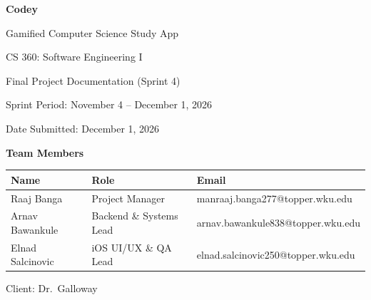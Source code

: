 \documentclass[12pt,letterpaper]{article}
\begin{document}
\begin{titlepage}
\begin{singlespace}
\centering
\vspace*{1.2in}
{\LARGE\bfseries Codey\par}
\vspace{0.25cm}
{\Large Gamified Computer Science Study App\par}
\vspace{1.2cm}
{\large CS 360: Software Engineering I\par}
\vspace{0.3cm}
{\large Final Project Documentation (Sprint 4)\par}
\vspace{0.3cm}
{\large Sprint Period: November 4 -- December 1, 2026\par}
\vspace{0.3cm}
{\large Date Submitted: December 1, 2026\par}
\vspace{1.6cm}
{\large\bfseries Team Members\par}
\vspace{0.4cm}
\begin{tabular}{lll}
\toprule
\textbf{Name} & \textbf{Role} & \textbf{Email} \\
\midrule
Raaj Banga        & Project Manager            & manraaj.banga277@topper.wku.edu \\
Arnav Bawankule   & Backend \& Systems Lead    & arnav.bawankule838@topper.wku.edu \\
Elnad Salcinovic  & iOS UI/UX \& QA Lead       & elnad.salcinovic250@topper.wku.edu \\
\bottomrule
\end{tabular}
\vfill
{\large Client: Dr.\ Galloway\par}
\vspace{0.5in}
\end{singlespace}
\end{titlepage}

\setcounter{page}{2}
\begin{singlespace}
\tableofcontents
\clearpage
\listoffigures
\listoftables
\end{singlespace}
\clearpage
\end{document}
